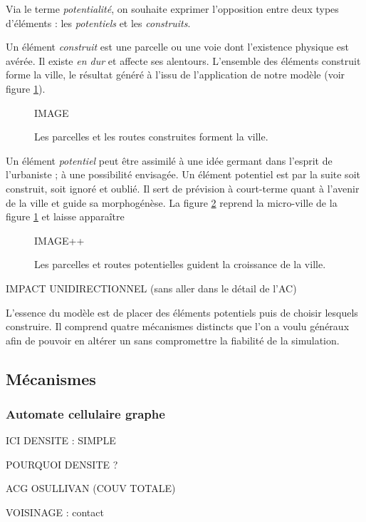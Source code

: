 \documentclass[12pt]{article}
\begin{document}
Via le terme \textit{potentialité}, on souhaite exprimer l'opposition
entre deux types d'éléments : les \textit{potentiels} et les
\textit{construits}.

Un élément \textit{construit} est une parcelle ou une voie dont
l'existence physique est avérée. Il existe \textit{en dur} et affecte
ses alentours. L'ensemble des éléments construit forme la ville, le
résultat généré à l'issu de l'application de notre modèle (voir figure
\ref{fig:construit}).

\begin{figure}
  \centering
  IMAGE
  \caption{Les parcelles et les routes construites forment la ville.}
  \label{fig:construit}
\end{figure}

Un élément \textit{potentiel} peut être assimilé à une idée germant
dans l'esprit de l'urbaniste ; à une possibilité envisagée. Un élément
potentiel est par la suite soit construit, soit ignoré et oublié. Il
sert de prévision à court-terme quant à l'avenir de la ville et guide
sa morphogénèse. La figure \ref{fig:potentiel} reprend la micro-ville
de la figure \ref{fig:construit} et laisse apparaître

\begin{figure}
  \centering
  IMAGE++
  \caption{Les parcelles et routes potentielles guident la croissance
    de la ville.}
  \label{fig:potentiel}
\end{figure}

IMPACT UNIDIRECTIONNEL (sans aller dans le détail de l'AC)

L'essence du modèle est de placer des éléments potentiels puis de
choisir lesquels construire. Il comprend quatre mécanismes distincts
que l'on a voulu généraux afin de pouvoir en altérer un sans
compromettre la fiabilité de la simulation.

\subsection{Mécanismes}

\subsubsection{Automate cellulaire graphe}

ICI DENSITE : SIMPLE

POURQUOI DENSITE ?

ACG OSULLIVAN (COUV TOTALE)

VOISINAGE : contact
\end{document}
